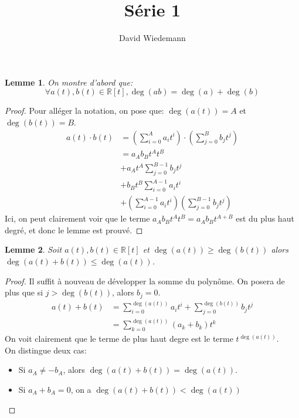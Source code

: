 \documentclass[11pt, a4paper, twoside]{article}
\newtheorem{lemma}{Lemme}
\begin{document}
\title{Série 1}
\author{David Wiedemann}
\maketitle
\begin{lemma}\label{degres}
On montre d'abord que:
\[ 
	\forall a(t) , b(t) \in \mathbb{R}[t], \deg (ab) = \deg(a) + \deg(b)
\]

\end{lemma}
\begin{proof}
Pour alléger la notation, on pose que: $\deg(a(t)) = A$ et $\deg(b(t)) = B$.\\
\begin{align*}
	a(t) \cdot b(t) &= \left( \sum_{i=0}^{A}a_i t^{i}\right) \cdot \left( \sum_{j=0}^{B}b_j t^{j}\right)\\
			&= a_A b_B t^{A} t^{B}\\
			&+ a_A t^{A} \sum_{j=0}^{B-1} b_j t^{j}\\
			&+ b_B t^{B} \sum_{i=0}^{A-1}a_i t^{i}\\
			&+ \left( \sum_{i=0}^{A-1} a_i t^{i}\right) \left( \sum_{j=0}^{B-1}b_j t^{j}\right)
\end{align*}
Ici, on peut clairement voir que le terme $a_A b_B t^{A} t^{B} =a_A b_B t^{A+B} $ est du plus haut degré, et donc le lemme est prouvé.
\end{proof}
\begin{lemma}\label{somme}
	Soit $a(t), b(t) \in \mathbb{R}[t]$ et $\deg(a(t))\geq\deg(b(t))$ alors $\deg(a(t) + b(t)) \leq \deg (a(t))$.
\end{lemma}
\begin{proof}
Il suffit à nouveau de développer la somme du polynôme.
On posera de plus que si $j>\deg(b(t))$, alors $b_j=0$.
\begin{align*}
	a(t) + b(t) &= \sum_{i=0}^{\deg(a(t))} a_i t^{i} + \sum_{j=0}^{\deg(b(t))} b_j t^{j}\\
		    &= \sum_{k=0}^{\deg(a(t))} (a_k + b_k) t^{k}
\end{align*}
On voit clairement que le terme de plus haut degre est le terme $t^{\deg(a(t))}$.\\
On distingue deux cas:
\begin{itemize}
	\item Si $a_A \neq -b_A$, alors $\deg(a(t)+ b(t)) = \deg(a(t))$.\\
	\item Si $a_A+b_A=0$, on a $\deg(a(t)+ b(t)) < \deg(a(t))$
\end{itemize}
\end{proof}
\end{document}
